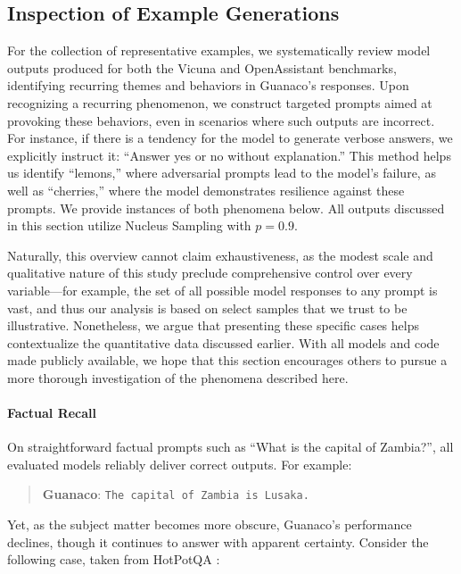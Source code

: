 \subsection{Inspection of Example Generations}
\label{ssec:examples}

For the collection of representative examples, we systematically review model outputs produced for both the Vicuna and OpenAssistant benchmarks, identifying recurring themes and behaviors in {Guanaco}'s responses. Upon recognizing a recurring phenomenon, we construct targeted prompts aimed at provoking these behaviors, even in scenarios where such outputs are incorrect. For instance, if there is a tendency for the model to generate verbose answers, we explicitly instruct it: ``Answer yes or no without explanation.'' This method helps us identify ``lemons,'' where adversarial prompts lead to the model's failure, as well as ``cherries,'' where the model demonstrates resilience against these prompts. We provide instances of both phenomena below. All outputs discussed in this section utilize Nucleus Sampling \cite{holtzmancurious} with $p=0.9$.

Naturally, this overview cannot claim exhaustiveness, as the modest scale and qualitative nature of this study preclude comprehensive control over every variable—for example, the set of all possible model responses to any prompt is vast, and thus our analysis is based on select samples that we trust to be illustrative. Nonetheless, we argue that presenting these specific cases helps contextualize the quantitative data discussed earlier. With all models and code made publicly available, we hope that this section encourages others to pursue a more thorough investigation of the phenomena described here.

\paragraph{Factual Recall} On straightforward factual prompts such as ``What is the capital of Zambia?'', all evaluated models reliably deliver correct outputs. For example:

\begin{quote} 
    \textbf{Guanaco}:
    \texttt{The capital of Zambia is Lusaka.}
\end{quote}

Yet, as the subject matter becomes more obscure, {Guanaco}’s performance declines, though it continues to answer with apparent certainty. Consider the following case, taken from HotPotQA \citep{yang2018hotpotqa}:

